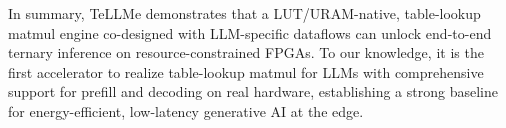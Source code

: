 \documentclass[sigconf]{acmart}
\begin{document}
In summary, TeLLMe demonstrates that a LUT/URAM-native, table-lookup matmul engine co-designed with LLM-specific dataflows can unlock end-to-end ternary inference on resource-constrained FPGAs. To our knowledge, it is the first accelerator to realize table-lookup matmul for LLMs with comprehensive support for prefill and decoding on real hardware, establishing a strong baseline for energy-efficient, low-latency generative AI at the edge.




\end{document}
